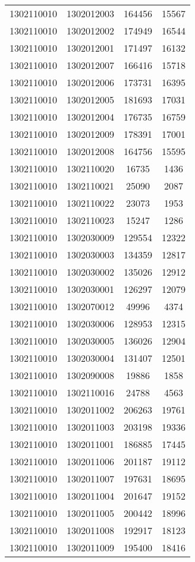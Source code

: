 \begin{longtable}{llcc}
1302110010 & 1302012003 & 164456 & 15567\\
1302110010 & 1302012002 & 174949 & 16544\\
1302110010 & 1302012001 & 171497 & 16132\\
1302110010 & 1302012007 & 166416 & 15718\\
1302110010 & 1302012006 & 173731 & 16395\\
1302110010 & 1302012005 & 181693 & 17031\\
1302110010 & 1302012004 & 176735 & 16759\\
1302110010 & 1302012009 & 178391 & 17001\\
1302110010 & 1302012008 & 164756 & 15595\\
1302110010 & 1302110020 & 16735 & 1436\\
1302110010 & 1302110021 & 25090 & 2087\\
1302110010 & 1302110022 & 23073 & 1953\\
1302110010 & 1302110023 & 15247 & 1286\\
1302110010 & 1302030009 & 129554 & 12322\\
1302110010 & 1302030003 & 134359 & 12817\\
1302110010 & 1302030002 & 135026 & 12912\\
1302110010 & 1302030001 & 126297 & 12079\\
1302110010 & 1302070012 & 49996 & 4374\\
1302110010 & 1302030006 & 128953 & 12315\\
1302110010 & 1302030005 & 136026 & 12904\\
1302110010 & 1302030004 & 131407 & 12501\\
1302110010 & 1302090008 & 19886 & 1858\\
1302110010 & 1302110016 & 24788 & 4563\\
1302110010 & 1302011002 & 206263 & 19761\\
1302110010 & 1302011003 & 203198 & 19336\\
1302110010 & 1302011001 & 186885 & 17445\\
1302110010 & 1302011006 & 201187 & 19112\\
1302110010 & 1302011007 & 197631 & 18695\\
1302110010 & 1302011004 & 201647 & 19152\\
1302110010 & 1302011005 & 200442 & 18996\\
1302110010 & 1302011008 & 192917 & 18123\\
1302110010 & 1302011009 & 195400 & 18416\\

\end{longtable}
